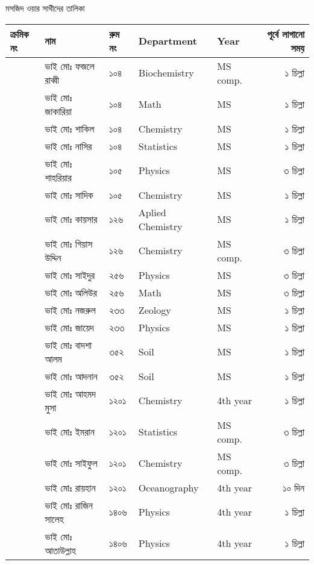\documentclass{article}
\newcounter{magicrownumbers}
\newcommand\rownumber{\stepcounter{magicrownumbers}\arabic{magicrownumbers}}
\begin{document}
\begin{center}
মসজিদ ওয়ার সাথীদের তালিকা
\end{center}
\noindent
\centering
\noindent
  \begin{tabular}{@{}lll
>{\selectlanguage{english}}l
>{\selectlanguage{english}}l
    r@{}}
\toprule
ক্রমিক নং &  নাম &  রুম নং &  Department & Year & পূর্বে লাগানো সময়\\
\toprule
\rownumber & ভাই মোঃ ফজলে রাব্বী  & ১০৪ & Biochemistry & MS comp. & ১ চিল্লা\\ 
\rownumber & ভাই মোঃ জাকারিয়া & ১০৪ & Math & MS & ১ চিল্লা\\
\rownumber & ভাই মোঃ শাকিল & ১০৪ & Chemistry & MS & ১ চিল্লা\\
\rownumber & ভাই মোঃ নাসির & ১০৪ & Statistics & MS & ১ চিল্লা\\
\rownumber & ভাই মোঃ শাহরিয়ার & ১০৫ & Physics & MS & ৩ চিল্লা\\
\rownumber & ভাই মোঃ সাদিক & ১০৫ & Chemistry & MS & ১ চিল্লা\\
\rownumber & ভাই মোঃ কায়সার & ১২৬ & Aplied Chemistry & MS & ১ চিল্লা\\ 
\rownumber & ভাই মোঃ গিয়াস উদ্দিন  & ১২৬ & Chemistry & MS comp. & ৩ চিল্লা\\ 
\rownumber & ভাই মোঃ সাইদুর & ২৫৬ & Physics & MS & ৩ চিল্লা\\ 
\rownumber & ভাই মোঃ অলিউর & ২৫৬ & Math & MS & ৩ চিল্লা\\ 
\rownumber & ভাই মোঃ নজরুল  & ২৩৩ & Zeology & MS & ১ চিল্লা\\ 
\rownumber & ভাই মোঃ জায়েদ & ২৩৩ & Physics & MS & ১ চিল্লা\\ 
\rownumber & ভাই মোঃ বাদশা আলম & ৩৫২ & Soil & MS & ১ চিল্লা\\
\rownumber & ভাই মোঃ আদনান & ৩৫২ & Soil & MS & ১ চিল্লা\\
\rownumber & ভাই মোঃ আহমদ মুসা & ১২০১ & Chemistry & 4th year & ১ চিল্লা\\ 
\rownumber & ভাই মোঃ ইমরান & ১২০১ & Statistics & MS comp. & ৩ চিল্লা\\ 
\rownumber & ভাই মোঃ সাইফুল & ১২০১ & Chemistry & MS comp. & ৩ চিল্লা\\ 
\rownumber & ভাই মোঃ রায়হান  & ১২০১ & Oceanography & 4th year & ১০ দিন\\
\rownumber & ভাই মোঃ রাজিন সালেহ & ১৪০৬ & Physics & 4th year & ১ চিল্লা\\ 
\rownumber & ভাই মোঃ আতাউল্লাহ & ১৪০৬ & Physics & 4th year & ১ চিল্লা\\  

\end{tabular}
\end{document}
